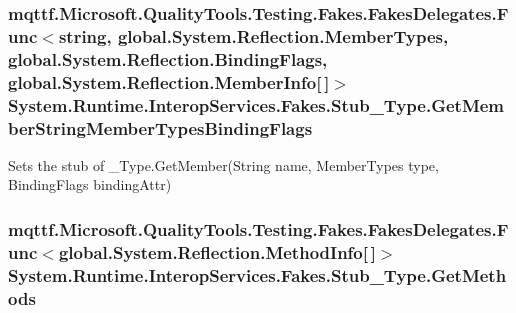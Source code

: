 \hypertarget{class_system_1_1_runtime_1_1_interop_services_1_1_fakes_1_1_stub___type_a0af3473c152c0b59ac08f108e647ad53}{
\subsubsection[{Get\-Member\-String\-Member\-Types\-Binding\-Flags}]{\setlength{\rightskip}{0pt plus 5cm}mqttf.\-Microsoft.\-Quality\-Tools.\-Testing.\-Fakes.\-Fakes\-Delegates.\-Func$<$string, global.\-System.\-Reflection.\-Member\-Types, global.\-System.\-Reflection.\-Binding\-Flags, global.\-System.\-Reflection.\-Member\-Info\mbox{[}$\,$\mbox{]}$>$ System.\-Runtime.\-Interop\-Services.\-Fakes.\-Stub\-\_\-\-Type.\-Get\-Member\-String\-Member\-Types\-Binding\-Flags}}\label{class_system_1_1_runtime_1_1_interop_services_1_1_fakes_1_1_stub___type_a0af3473c152c0b59ac08f108e647ad53}


Sets the stub of \-\_\-\-Type.\-Get\-Member(\-String name, Member\-Types type, Binding\-Flags binding\-Attr)

\hypertarget{class_system_1_1_runtime_1_1_interop_services_1_1_fakes_1_1_stub___type_a65a47500598b17b3a2236da7798eac7e}{
\subsubsection[{Get\-Methods}]{\setlength{\rightskip}{0pt plus 5cm}mqttf.\-Microsoft.\-Quality\-Tools.\-Testing.\-Fakes.\-Fakes\-Delegates.\-Func$<$global.\-System.\-Reflection.\-Method\-Info\mbox{[}$\,$\mbox{]}$>$ System.\-Runtime.\-Interop\-Services.\-Fakes.\-Stub\-\_\-\-Type.\-Get\-Methods}}\label{class_system_1_1_runtime_1_1_interop_services_1_1_fakes_1_1_stub___type_a65a47500598b17b3a2236da7798eac7e}


